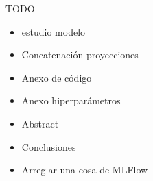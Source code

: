 \documentclass[a4paper,12pt,twoside,titlepage]{article}
\begin{document}
TODO
\begin{itemize}
  \item estudio modelo
  \item Concatenación proyecciones
  \item Anexo de código
  \item Anexo hiperparámetros
  \item Abstract
  \item Conclusiones
  \item Arreglar una cosa de MLFlow
\end{itemize}

\newpage

\printbibliography[title={Bibliografía}]
\end{document}
